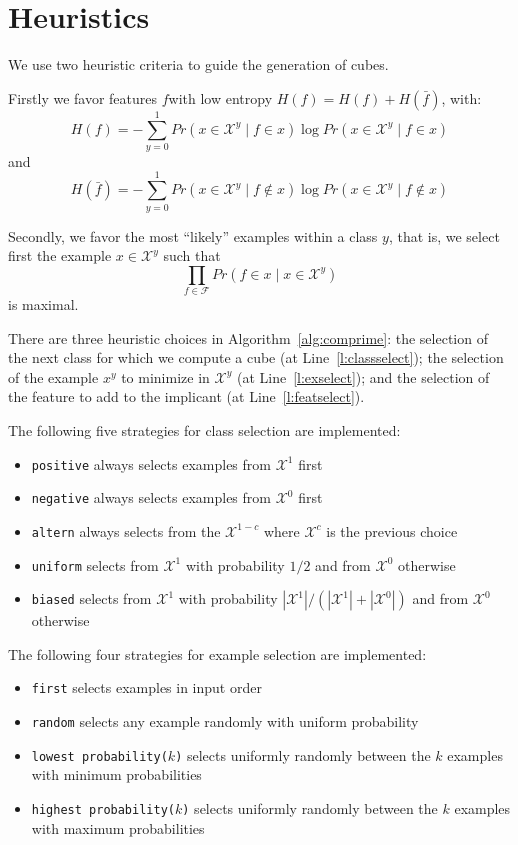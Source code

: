 \documentclass{article}
\newcommand{\setex}[1]{\ensuremath{{\mathcal X}^{#1}}\xspace}
\newcommand{\posex}{{\setex{1}}\xspace}
\newcommand{\negex}{{\setex{0}}\xspace}
\newcommand{\features}{\ensuremath{{\mathcal F}}\xspace}
\newcommand{\feat}{\ensuremath{f}}
\newcommand{\var}{\ensuremath{x}}
\newcommand{\ex}{\ensuremath{\var}}
\newcommand{\entropy}[1]{\ensuremath{{H}({#1})}\xspace}
\newcommand{\probability}[2]{\ensuremath{{Pr}({#1 \mid #2})}\xspace}
\begin{document}
\section*{Heuristics}

We use two heuristic criteria to guide the generation of cubes. 

Firstly we favor features \feat with low entropy $\entropy{\feat} = \entropy{\feat} + \entropy{\bar{\feat}}$, with:
\[
\entropy{\feat} = - \sum_{y=0}^1 \probability{x \in \setex{y}}{\feat \in x} \log \probability{x \in \setex{y}}{\feat \in x}
\]
and 
\[
\entropy{\bar{\feat}} = - \sum_{y=0}^1 \probability{x \in \setex{y}}{\feat \not\in x} \log \probability{x \in \setex{y}}{\feat \not\in x}
\]

Secondly, we favor the most ``likely'' examples within a class $y$, that is, we select first the example $x \in \setex{y}$ such that 
\[
\prod_{\feat \in \features} \probability{\feat \in x}{x \in \setex{y}}
\]
is maximal.


There are three heuristic choices in Algorithm~\ref{alg:comprime}: 
the selection of the next class for which we compute a cube (at Line~\ref{l:classselect}); the selection of the example $\ex^y$ to minimize in $\setex{y}$ (at Line~\ref{l:exselect}); and the selection of the feature to add to the implicant (at Line~\ref{l:featselect}).


The following five strategies for class selection are implemented:
\begin{itemize}
	\item \texttt{positive} always selects examples from $\posex$ first
		\item \texttt{negative} always selects examples from $\negex$ first
	\item \texttt{altern} always selects from the $\setex{1-c}$ where $\setex{c}$ is the previous choice
\item \texttt{uniform} selects from $\posex$ with probability $1/2$ and from $\negex$ otherwise
\item \texttt{biased} selects from $\posex$ with probability $|\posex|/(|\posex|+|\negex|)$ and from $\negex$ otherwise
\end{itemize}


The following four strategies for example selection are implemented:
\begin{itemize}
	\item \texttt{first} selects examples in input order
	\item \texttt{random} selects any example randomly with uniform probability
	\item \texttt{lowest probability($k$)} selects uniformly randomly between the $k$ examples with minimum probabilities
	\item \texttt{highest probability($k$)} selects uniformly randomly between the $k$ examples with maximum probabilities
\end{itemize}
\end{document}
